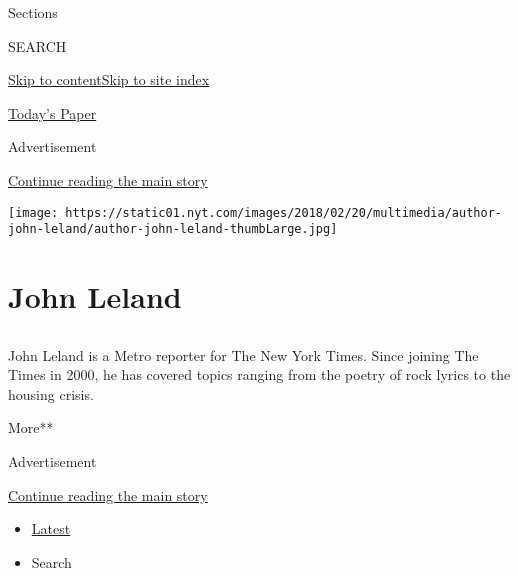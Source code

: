 Sections

SEARCH

\protect\hyperlink{site-content}{Skip to
content}\protect\hyperlink{site-index}{Skip to site index}

\href{https://myaccount.nytimes.com/auth/login?response_type=cookie\&client_id=vi}{}

\href{https://www.nytimes.com/section/todayspaper}{Today's Paper}

Advertisement

\protect\hyperlink{after-top}{Continue reading the main story}

\texttt{[image: https://static01.nyt.com/images/2018/02/20/multimedia/author-john-leland/author-john-leland-thumbLarge.jpg]}

\hypertarget{john-leland}{%
\section{John Leland}\label{john-leland}}

\subsection{}

John Leland is a Metro reporter for The New York Times. Since joining
The Times in 2000, he has covered topics ranging from the poetry of rock
lyrics to the housing crisis.

More**

Advertisement

\protect\hyperlink{after-mid1}{Continue reading the main story}

\begin{itemize}
\tightlist
\item
  \protect\hyperlink{stream-panel}{Latest}
\item
  Search
\end{itemize}

